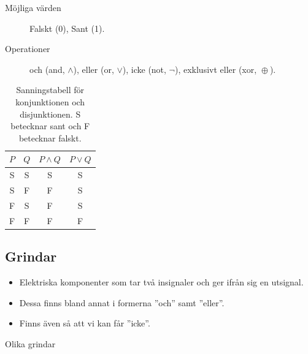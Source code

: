 \documentclass{beamer}
\DeclareMathOperator{\xor}{\oplus}
\theoremstyle{definition}
\theoremstyle{remark}
\begin{document}
\begin{frame}{\insertsubsectionhead}
  \begin{description}
    \item[Möjliga värden] Falskt (0), Sant (1).
    \item[Operationer] och (and, \(\land\)),
      eller (or, \(\lor\)),
      icke (not, \(\lnot\)),
      exklusivt eller (xor, \(\xor\)).
  \end{description}
\end{frame}

\begin{frame}{\insertsubsectionhead}
  \begin{table}
    \caption{Sanningstabell för konjunktionen och disjunktionen. S betecknar 
      sant
      och F betecknar falskt.}
    \begin{tabular}{c|c|c|c}
      \toprule
      \(P\)    & \(Q\)      & \(P\land Q\)  & \(P\lor Q\) \\
      \midrule
      S      &  S      & S       & S \\
      S      &  F      & F        & S \\
      F      &  S      & F        & S \\
      F      &  F      & F        & F \\
      \bottomrule
    \end{tabular}
    \label{tbl:SanningKonjunktionDisjunktion}
  \end{table}
\end{frame}

\subsection{Grindar}

\begin{frame}{\insertsubsectionhead}
  \begin{itemize}
    \item Elektriska komponenter som tar två insignaler och ger ifrån sig en 
      utsignal.
    \item Dessa finns bland annat i formerna ''och'' samt ''eller''.
    \item Finns även så att vi kan får ''icke''.
  \end{itemize}
\end{frame}

\begin{frame}{\insertsubsectionhead}{Olika grindar}
\end{frame}
\end{document}
